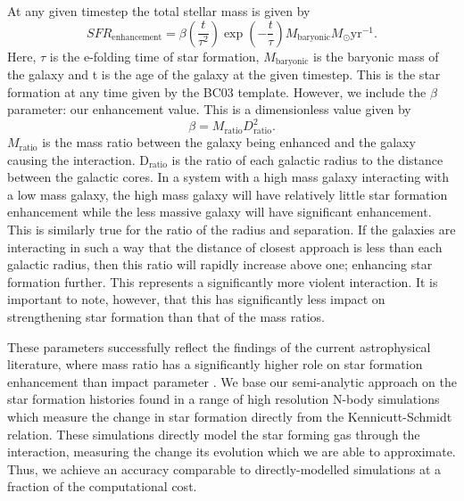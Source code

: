 At any given timestep the total stellar mass is given by
\begin{equation}\label{Total_SFR}
    SFR_{\text{enhancement}} = \beta (\frac{t}{\tau^{2}}) \exp(-\frac{t}{\tau}) M_{\text{baryonic}} M_{\odot} \text{yr}^{-1}.
\end{equation}
Here, $\tau$ is the e-folding time of star formation, $M_{\text{baryonic}}$ is the baryonic mass of the galaxy and t is the age of the galaxy at the given timestep. This is the star formation at any time given by the BC03 template. However, we include the $\beta$ parameter: our enhancement value. This is a dimensionless value given by
\begin{equation}\label{enhancement_param}
    \beta = M_{\text{ratio}} D_{\text{ratio}}^{2}.
\end{equation}
$M_{\text{ratio}}$ is the mass ratio between the galaxy being enhanced and the galaxy causing the interaction. D$_{\text{ratio}}$ is the ratio of each galactic radius to the distance between the galactic cores. In a system with a high mass galaxy interacting with a low mass galaxy, the high mass galaxy will have relatively little star formation enhancement while the less massive galaxy will have significant enhancement. This is similarly true for the ratio of the radius and separation. If the galaxies are interacting in such a way that the distance of closest approach is less than each galactic radius, then this ratio will rapidly increase above one; enhancing star formation further. This represents a significantly more violent interaction. It is important to note, however, that this has significantly less impact on strengthening star formation than that of the mass ratios. 

These parameters successfully reflect the findings of the current astrophysical literature, where mass ratio has a significantly higher role on star formation enhancement than impact parameter \citep{2003ApJ...582..668B, 2008MNRAS.391.1137L, 2008MNRAS.385.1903L}. We base our semi-analytic approach on the star formation histories found in a range of high resolution N-body simulations \citep{1996ApJ...464..641M, 2000MNRAS.312..859S, 2019MNRAS.490.2139R} which measure the change in star formation directly from the Kennicutt-Schmidt \citep{1998ApJ...498..541K} relation. These simulations directly model the star forming gas through the interaction, measuring the change its evolution which we are able to approximate. Thus, we achieve an accuracy comparable to directly-modelled simulations at a fraction of the computational cost.

